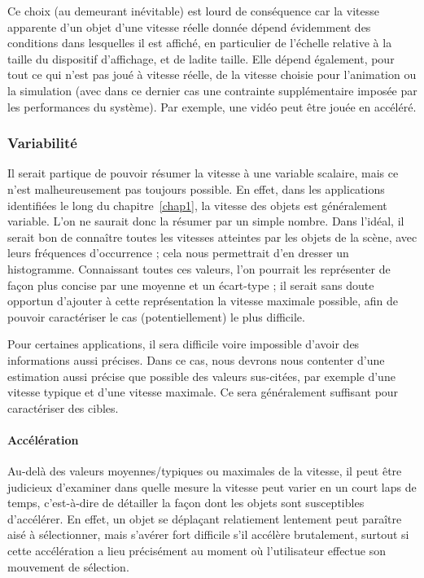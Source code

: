     Ce choix (au demeurant inévitable) est lourd de conséquence car la vitesse apparente d'un objet d'une vitesse réelle donnée dépend évidemment des conditions dans lesquelles il est affiché, en particulier de l'échelle relative à la taille du dispositif d'affichage, et de ladite taille. Elle dépend également, pour tout ce qui n'est pas joué à vitesse réelle, de la vitesse choisie pour l'animation ou la simulation (avec dans ce dernier cas une contrainte supplémentaire imposée par les performances du système). Par exemple, une vidéo peut être jouée en accéléré.
    
	\subsubsection{Variabilité}
	Il serait partique de pouvoir résumer la vitesse à une variable scalaire, mais ce n'est malheureusement pas toujours possible. En effet, dans les applications identifiées le long du chapitre~\ref{chap1}, la vitesse des objets est généralement variable. L'on ne saurait donc la résumer par un simple nombre. Dans l'idéal, il serait bon de connaître toutes les vitesses atteintes par les objets de la scène, avec leurs fréquences d'occurrence ; cela nous permettrait d'en dresser un histogramme. Connaissant toutes ces valeurs, l'on pourrait les représenter de façon plus concise par une moyenne et un écart-type ; il serait sans doute opportun d'ajouter à cette représentation la vitesse maximale possible, afin de pouvoir caractériser le cas (potentiellement) le plus difficile.
	
	Pour certaines applications, il sera difficile voire impossible d'avoir des informations aussi précises. Dans ce cas, nous devrons nous contenter d'une estimation aussi précise que possible des valeurs sus-citées, par exemple d'une vitesse \og typique \fg{} et d'une vitesse maximale. Ce sera généralement suffisant pour caractériser des cibles.
	
	\paragraph{Accélération}
	Au-delà des valeurs moyennes/typiques ou maximales de la vitesse, il peut être judicieux d'examiner dans quelle mesure la vitesse peut varier en un court laps de temps, c'est-à-dire de détailler la façon dont les objets sont susceptibles d'accélérer. En effet, un objet se déplaçant relatiement lentement peut paraître aisé à sélectionner, mais s'avérer fort difficile s'il accélère brutalement, surtout si cette accélération a lieu précisément au moment où l'utilisateur effectue son mouvement de sélection.
	

